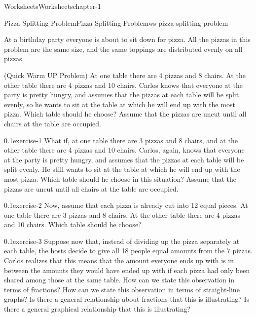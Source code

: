 \documentclass[twoside,11pt,]{book}
\begin{document}
\begin{chapterptx}{Worksheets}{}{Worksheets}{}{}{chapter-1}
%
%
\typeout{************************************************}
\typeout{************************************************}
%
\begin{worksheet-section-numberless}{Pizza Splitting Problem}{}{Pizza Splitting Problem}{}{}{ws-pizza-splitting-problem}
\begin{introduction}{}%
\hypertarget{p-1}{}%
At a birthday party everyone is about to sit down for pizza.  All the pizzas in this problem are the same size, and the same toppings are distributed evenly on all pizzas.%
\end{introduction}%
\hypertarget{p-2}{}%
(Quick Warm UP Problem) At one table there are 4 pizzas and 8 chairs.  At the other table there are 4 pizzas and 10 chairs.  Carlos knows that everyone at the party is pretty hungry, and assumes that the pizzas at each table will be split evenly, so he wants to sit at the table at which he will end up with the most pizza.  Which table should he choose?  Assume that the pizzas are uncut until all chairs at the table are occupied.%
\begin{divisionexercise}{1}{}{0.1}{exercise-1}%
\hypertarget{p-3}{}%
What if, at one table there are 3 pizzas and 8 chairs, and at the other table there are 4 pizzas and 10 chairs.  Carlos, again, knows that everyone at the party is pretty hungry, and assumes that the pizzas at each table will be split evenly.  He still wants to sit at the table at which he will end up with the most pizza.  Which table should he choose in this situation? Assume that the pizzas are uncut until all chairs at the table are occupied.%
\end{divisionexercise}%
\begin{divisionexercise}{2}{}{0.1}{exercise-2}%
\hypertarget{p-4}{}%
Now, assume that each pizza is already cut into 12 equal pieces. At one table there are 3 pizzas and 8 chairs.  At the other table there are 4 pizzas and 10 chairs.  Which table should he choose?%
\end{divisionexercise}%
\begin{divisionexercise}{3}{}{0.1}{exercise-3}%
\hypertarget{p-5}{}%
Suppose now that, instead of dividing up the pizza separately at each table, the hosts decide to give all 18 people equal amounts from the 7 pizzas.  Carlos realizes that this means that the amount everyone ends up with is in between the amounts they would have ended up with if each pizza had only been shared among those at the same table.  How can we state this observation in terms of fractions?  How can we state this observation in terms of straight-line graphs?  Is there a general relationship about fractions that this is illustrating?  Is there a general graphical relationship that this is illustrating?%

\end{divisionexercise}
\end{worksheet-section-numberless}
\end{chapterptx}
\end{document}
